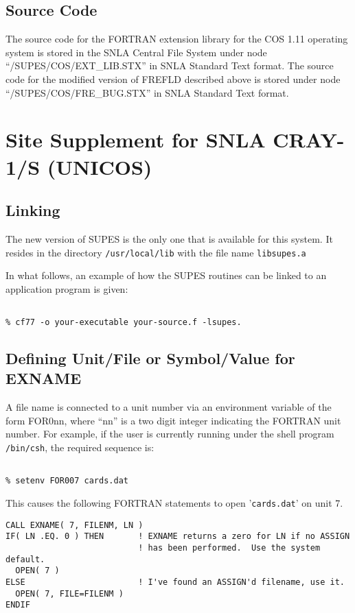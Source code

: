 \subsection{Source Code}
The source code for the FORTRAN extension library for the COS 1.11 operating
system is stored in the SNLA Central File System under node
``/SUPES/COS/EXT\_LIB.STX''
in SNLA Standard Text format.  The source code for
the modified version of FREFLD described above is stored under node
``/SUPES/COS/FRE\_BUG.STX'' in SNLA Standard Text format.

\cleardoublepage

\section{Site Supplement for SNLA CRAY-1/S (UNICOS)}

\subsection{Linking}
The new version of SUPES is the only one that is available for this system.
It resides in the directory \verb+/usr/local/lib+
with the file name \verb+libsupes.a+

In what follows,
an example of how the SUPES routines can be linked to an application program
is given:
\begin{verbatim}

% cf77 -o your-executable your-source.f -lsupes.
\end{verbatim}

\subsection{Defining Unit/File or Symbol/Value for EXNAME}
A file name is connected to a unit number via an environment
variable of the form FOR0nn,
where ``nn'' is a two digit integer indicating the FORTRAN unit number. For
example, if the user is currently running under the shell program
\verb+/bin/csh+, the required sequence is:
\begin{verbatim}

% setenv FOR007 cards.dat

\end{verbatim}
This causes the following FORTRAN statements to open '\verb+cards.dat+' on unit 7.
\begin{verbatim}
CALL EXNAME( 7, FILENM, LN )
IF( LN .EQ. 0 ) THEN       ! EXNAME returns a zero for LN if no ASSIGN
                           ! has been performed.  Use the system default.
  OPEN( 7 )
ELSE                       ! I've found an ASSIGN'd filename, use it.
  OPEN( 7, FILE=FILENM )
ENDIF
\end{verbatim}

